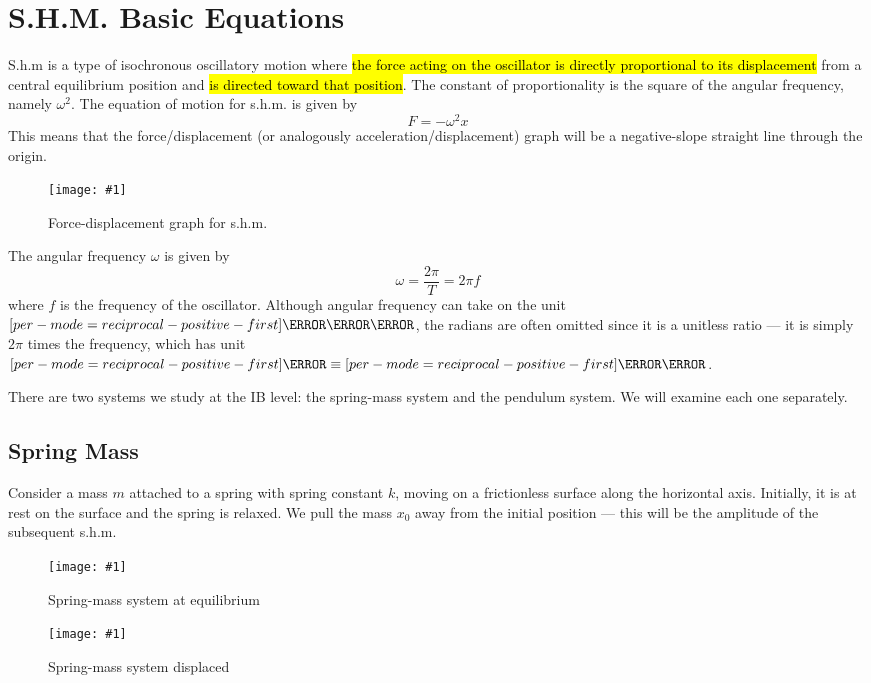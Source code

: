 \documentclass[a4paper,12pt]{article}
\let\oldsection\section
\renewcommand\section{\clearpage\oldsection}
\let\oldsi\si
\renewcommand{\si}[1]{\oldsi[per-mode=reciprocal-positive-first]{#1}}
\newcommand{\lb}{\\[8pt]}
\newcommand{\img}[4]{\begin{center}
  \begin{figure}[H]
    \centering
    \texttt{[image: \#1]}
    \caption{#3}
    \label{fig:#4}
  \end{figure}
\end{center}}
\begin{document}
\section{S.H.M. Basic Equations}

S.h.m is a type of isochronous oscillatory motion where \hl{the force acting on the oscillator is directly proportional to its displacement} from a central equilibrium position and \hl{is directed toward that position}. The constant of proportionality is the square of the angular frequency, namely $\omega^2$. The equation of motion for s.h.m. is given by
\begin{equation}
  F = -\omega^2 x
\end{equation}
This means that the force/displacement (or analogously acceleration/displacement) graph will be a negative-slope straight line through the origin.
\img{shmrequirement.png}{0.4}{Force-displacement graph for s.h.m.}{shmrequirement}
The angular frequency $\omega$ is given by
$$\omega = \frac{2\pi}{T} = 2\pi f$$
where $f$ is the frequency of the oscillator. Although angular frequency can take on the unit $\si{\radian\per\second}$, the radians are often omitted since it is a unitless ratio --- it is simply $2\pi$ times the frequency, which has unit $\si{\hertz}\equiv \si{\per\s}$.

There are two systems we study at the IB level: the spring-mass system and the pendulum system. We will examine each one separately.

\pagebreak

\subsection{Spring Mass}

Consider a mass $m$ attached to a spring with spring constant $k$, moving on a frictionless surface along the horizontal axis. Initially, it is at rest on the surface and the spring is relaxed. We pull the mass $x_0$ away from the initial position --- this will be the amplitude of the subsequent s.h.m.

\hspace*{0.1\textwidth}
\begin{minipage}{0.3\textwidth}
  \img{springmass1.png}{1}{Spring-mass system at equilibrium}{springmass1}
\end{minipage}\hspace*{0.1\textwidth}%
\begin{minipage}{0.4\textwidth}
  \img{springmass2.png}{1}{Spring-mass system displaced}{springmass2}
\end{minipage}\hspace*{0.1\textwidth}\lb
\end{document}
